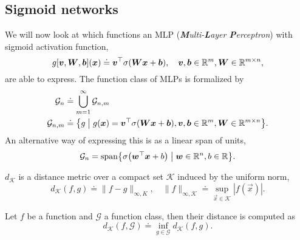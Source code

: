 \subsection{Sigmoid networks}


We will now look at which functions an MLP (\textit{\textbf{M}ulti-\textbf{L}ayer
    \textbf{P}erceptron}) with sigmoid activation function, \[
    g[\bm{v},\bm{W},\bm{b}](\bm{x}) \doteq \bm{v}^\top \sigma(\bm{W}\bm{x} + \bm{b}), \quad \bm{v}, \bm{b} \in \mathbb{R}^m, \bm{W} \in \mathbb{R}^{m\times n},
\]
are able to express. The function class of MLPs is formalized by
\begin{align*}
    \mathcal{G}_n     & \doteq \bigcup_{m=1}^\infty \mathcal{G}_{n,m}                                                                                                                 \\
    \mathcal{G}_{n,m} & \doteq \lft\{ g \;\middle|\; g(\vec{x}) = \transpose{\vec{v}} \sigma(\mat{W}\vec{x} + \vec{b}), \vec{v}, \vec{b} \in \R^m, \mat{W} \in \R^{m\times n} \rgt\}.
\end{align*}
An alternative way of expressing this is as a linear span of units, \[
    \mathcal{G}_n = \mathrm{span} \lft\{ \sigma \lft( \transpose{\vec{w}}\vec{x} + b \rgt) \;\middle|\; \vec{w} \in \R^n, b \in \R \rgt\}.
\]

\begin{definition}
    $d_{\mathcal{K}}$ is a distance metric over a compact set $\mathcal{K}$ induced by the uniform norm, \[
        d_{\mathcal{K}}(f,g) \doteq \| f - g \|_{\infty,K}, \quad \| f \|_{\infty,\mathcal{K}} \doteq \sup_{\vec{x} \in \mathcal{K}} |f(\vec{x})|.
    \]
\end{definition}

\begin{definition}
    Let $f$ be a function and $\mathcal{G}$ a function class, then their distance is computed as \[
        d_{\mathcal{K}}(f,\mathcal{G}) \doteq \inf_{g \in \mathcal{G}} d_{\mathcal{K}}(f,g).
    \]
\end{definition}

